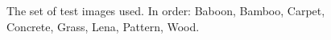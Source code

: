 \documentclass[12pt]{CPP}
\begin{document}
\begin{figure}[!htbp]
\begin{center}
\end{center}
\caption{The set of test images used. In order: Baboon, Bamboo, Carpet, Concrete, Grass, Lena, Pattern, Wood.}
\end{figure}
\end{document}
